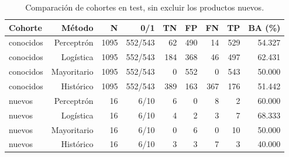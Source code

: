 \begin{table}[htbp]
\centering\small
\caption{Comparación de cohortes en test, sin excluir los productos nuevos.}\label{tab:cohortes}
\begin{tabular}{lrrrrrrrr}\toprule
Cohorte & Método & N & 0/1 & TN & FP & FN & TP & BA (\%) \\ \midrule
conocidos & Perceptrón & 1095 & 552/543 & 62 & 490 & 14 & 529 & 54.327 \\
conocidos & Logística & 1095 & 552/543 & 184 & 368 & 46 & 497 & 62.431 \\
conocidos & Mayoritario & 1095 & 552/543 & 0 & 552 & 0 & 543 & 50.000 \\
conocidos & Histórico & 1095 & 552/543 & 389 & 163 & 367 & 176 & 51.442 \\
nuevos & Perceptrón & 16 & 6/10 & 6 & 0 & 8 & 2 & 60.000 \\
nuevos & Logística & 16 & 6/10 & 4 & 2 & 3 & 7 & 68.333 \\
nuevos & Mayoritario & 16 & 6/10 & 0 & 6 & 0 & 10 & 50.000 \\
nuevos & Histórico & 16 & 6/10 & 3 & 3 & 7 & 3 & 40.000 \\
\bottomrule\end{tabular}
\end{table}
